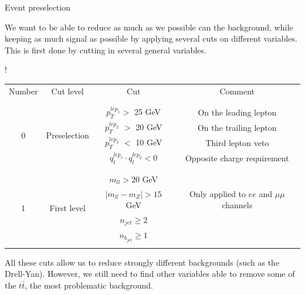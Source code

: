 \documentclass[8 pt]{beamer}
\begin{document}
\begin{frame}{Event preselection}

	\justifying
	We want to be able to reduce as much as we possible can the background, while keeping as much signal as possible by applying several cuts on different variables. This is first done by cutting in several general variables. \vfill  %

\hspace{4pt}
   \begin{minipage}[c]{.02\linewidth}
	\begin{exampleblock}{}  \end{exampleblock}
   \end{minipage}	
   \hspace{2pt}
   \begin{minipage}[c]{.97\linewidth}
   \begin{center}
   \resizebox{300pt} {!}{
   \begin{tabular}{c|c|c|c}
   Number & Cut level & Cut & Comment \\
   	& & & \\
   	\hline \hline
	& & & \\
	  \multirow{4}{*}{0} & \multirow{4}{*}{Preselection} & $p_{T}^{lep_1} >$ 25 GeV & On the leading lepton\\ 
	  & & $p_{T}^{lep_2}$ $>$ 20 GeV & On the trailing lepton \\ 
	  & & $p_{T}^{lep_3}$ $<$ 10 GeV &Third lepton veto \\ 
	  & & $q_{l}^{lep_1} \cdot q_{l}^{lep_2} < 0$ & Opposite charge requirement \\ 
	  & & & \\
	  \hline
	   & & & \\
	  \multirow{4}{*}{1} & \multirow{4}{*}{First level} & $m_{ll} > 20$ GeV &  \\
	  & & $|m_{ll} - m_Z| > 15$ GeV & Only applied to $ee$ and $\mu \mu$ channels \\
	  & & $n_{jet} \geq 2$ &  \\
	  & & $n_{b_{jet}} \geq 1$ &  \\
	  & & & \\
   \end{tabular}
   } 
   \end{center}
   \end{minipage} \hfill \vfill

	\justifying
	All these cuts allow us to reduce strongly different backgrounds (such as the Drell-Yan). However, we still need to find other variables able to remove some of the $t \bar t$, the most problematic background. \vfill

\end{frame}
\end{document}
